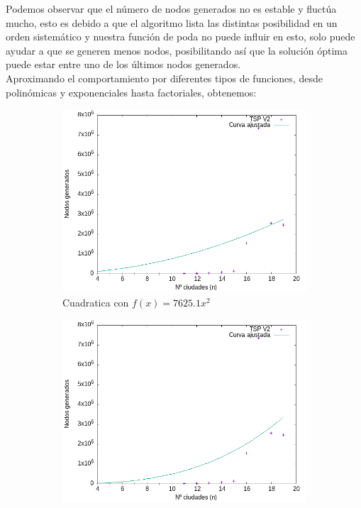 \documentclass{article}
\begin{document}
Podemos observar que el número de nodos generados  no es estable y fluctúa mucho, esto es debido a que el algoritmo lista las distintas posibilidad en un orden sistemático y nuestra función de poda no puede influir en esto, solo puede ayudar a que se generen menos nodos, posibilitando así que la solución óptima puede estar entre uno de los últimos nodos generados. \\

Aproximando el comportamiento por diferentes tipos de funciones, desde polinómicas y exponenciales hasta factoriales, obtenemos: 

\begin{figure}[H]
    \centering
    \begin{subfigure}[b]{0.45\textwidth}
        \centering
        \includegraphics[width=\textwidth]{Sucio_Olga/Data/CurvaAjustadaCuadratica.png}
        \caption{Cuadratica con $f(x)=7625.1 x^2$}
    \end{subfigure}
    \begin{subfigure}[b]{0.45\textwidth}
        \centering
        \includegraphics[width=\textwidth]{Sucio_Olga/Data/CurvaAjustadaCubica.png}

\end{subfigure}
\end{figure}
\end{document}
